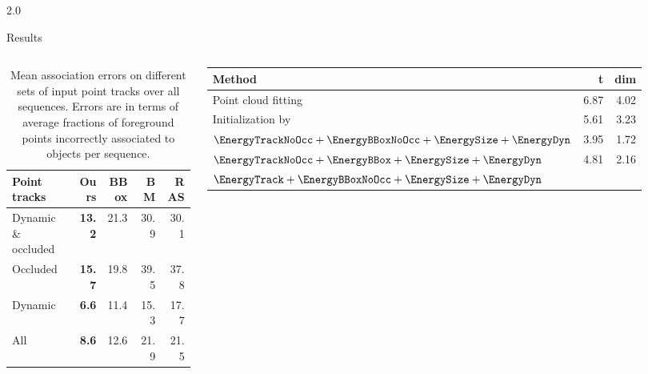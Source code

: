 \documentclass[handout,final]{beamer}
\newlength{\sepwid}
\newlength{\onecolwid}
\begin{document}
\begin{frame}[t]
\begin{columns}[t]
\begin{column}{\onecolwid}
    \end{column}
    \begin{column}{\sepwid}\end{column}			%
    \begin{column}{2.0\onecolwid}
      \begin{block}{Results}
        \vspace*{-\baselineskip}
        \begin{columns}[t]
          \column{1.000\onecolwid}
          \begin{table}
            \begin{tabular}{lrrrr}
              \toprule
              Point tracks & Ours & BBox & BM & RAS\\
              \midrule
              Dynamic \& occluded         & \textbf{13.2} & 21.3 & 30.9 & 30.1 \\
              Occluded		              & \textbf{15.7} & 19.8 & 39.5 & 37.8 \\
              Dynamic		              & \textbf{6.6} & 11.4 & 15.3 & 17.7 \\
              All		                  & \textbf{8.6} & 12.6 & 21.9 & 21.5 \\
              \bottomrule
            \end{tabular}
            \caption{\small Mean association errors on different sets of input point tracks over all sequences. Errors are in terms of average fractions of foreground points incorrectly associated to objects per sequence.}
            \label{tab:meanAssoc}
          \end{table}
          \column{1.000\onecolwid}
          \begin{table}
            \begin{tabular}{lrr}
              \toprule
              Method & t & dim \\
              \midrule
              Point cloud fitting
              & 6.87 & 4.02\\
              Initialization by~\cite{Song_Chandraker_2014}
              & 5.61 & 3.23\\
              $\EnergyTrackNoOcc + \EnergyBBoxNoOcc +\EnergySize+\EnergyDyn$ 
              & 3.95  & 1.72\\        
              $\EnergyTrackNoOcc + \EnergyBBox +\EnergySize+\EnergyDyn$        
              & 4.81  & 2.16\\        
              $\EnergyTrack + \EnergyBBoxNoOcc +\EnergySize+\EnergyDyn$      

\end{tabular}
\end{table}
\end{columns}
\end{block}
\end{column}
\end{columns}
\end{frame}
\end{document}
